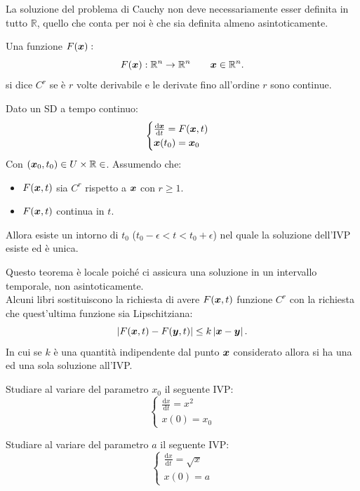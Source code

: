 \noindent
La soluzione del problema di Cauchy non deve necessariamente esser definita in tutto $\mathbb{R}$, quello che conta per noi è che sia definita almeno asintoticamente.
\begin{defn}[Funzione $C^r$]
    Una funzione $F(\boldsymbol{x}):$
    \[
	F(\boldsymbol{x}): \mathbb{R}^n\to \mathbb{R}^n \qquad \boldsymbol{x}\in \mathbb{R}^n
    .\] si dice $C^r$ se è $r$ volte derivabile e le derivate fino all'ordine $r$ sono continue.
\end{defn}
\noindent
\begin{thm}
   Dato un SD a tempo continuo:
   \[
       \begin{cases}
	   \frac{\text{d} \boldsymbol{x}}{\text{d} t} = F(\boldsymbol{x}, t)\\
	   \boldsymbol{x} (t_0) = \boldsymbol{x}_0
       \end{cases}
   \] 
   Con $\left(\boldsymbol{x}_0, t_0\right) \in U\times \mathbb{R} \in $. Assumendo che:
   \begin{itemize}
       \item $F(\boldsymbol{x},t)$ sia $C^r$ rispetto a $\boldsymbol{x}$ con $r\ge 1$.
       \item $F(\boldsymbol{x}, t)$ continua in $t$.
   \end{itemize}
   Allora esiste un intorno di $t_0$ ($t_0-\epsilon  < t < t_0+\epsilon$) nel quale la soluzione dell'IVP esiste ed è unica.
\end{thm}
\noindent
Questo teorema è locale poiché ci assicura una soluzione in un intervallo temporale, non asintoticamente.\\
Alcuni libri sostituiscono la richiesta di avere $F(\boldsymbol{x}, t)$ funzione $C^r$ con la richiesta che quest'ultima funzione sia Lipschitziana:
\[
    \left|F(\boldsymbol{x}, t)-F(\boldsymbol{y}, t)\right| \le k \left|\boldsymbol{x}-\boldsymbol{y}\right|
.\] 
In cui se $k$  è una quantità indipendente dal punto $\boldsymbol{x}$  considerato allora si ha una ed una sola soluzione all'IVP.
\begin{ex}[Esercizio]
    Studiare al variare del parametro $x_0$  il seguente IVP:
    \[
        \begin{cases}
            \frac{\text{d} x}{\text{d} t} = x^2\\
	    x(0) = x_0
        \end{cases}
    \] 
\end{ex}
\noindent
\begin{ex}[Esercizio]
    Studiare al variare del parametro $a$ il seguente IVP:
    \[
        \begin{cases}
            \frac{\text{d} x}{\text{d} t} = \sqrt{x} \\
	    x(0)=a
        \end{cases}
    \] 
\end{ex}
